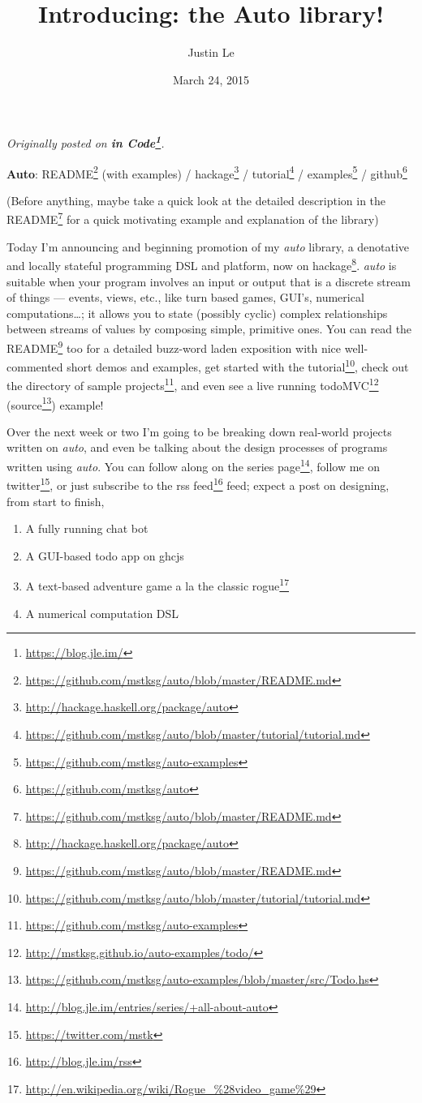 \documentclass[]{article}
\title{Introducing: the Auto library!}
\author{Justin Le}
\date{March 24, 2015}
\renewcommand{\href}[2]{#2\footnote{\url{#1}}}
\begin{document}
\maketitle

\emph{Originally posted on \textbf{\href{https://blog.jle.im/}{in
Code}}.}

\textbf{Auto}:
\href{https://github.com/mstksg/auto/blob/master/README.md}{README}
(with examples) /
\href{http://hackage.haskell.org/package/auto}{hackage} /
\href{https://github.com/mstksg/auto/blob/master/tutorial/tutorial.md}{tutorial}
/ \href{https://github.com/mstksg/auto-examples}{examples} /
\href{https://github.com/mstksg/auto}{github}

(Before anything, maybe take a quick look at the detailed description in
the \href{https://github.com/mstksg/auto/blob/master/README.md}{README}
for a quick motivating example and explanation of the library)

Today I'm announcing and beginning promotion of my \emph{auto} library,
a denotative and locally stateful programming DSL and platform, now
\href{http://hackage.haskell.org/package/auto}{on hackage}. \emph{auto}
is suitable when your program involves an input or output that is a
discrete stream of things --- events, views, etc., like turn based
games, GUI's, numerical computations\ldots{}; it allows you to state
(possibly cyclic) complex relationships between streams of values by
composing simple, primitive ones. You can read the
\href{https://github.com/mstksg/auto/blob/master/README.md}{README} too
for a detailed buzz-word laden exposition with nice well-commented short
demos and examples, get started with
\href{https://github.com/mstksg/auto/blob/master/tutorial/tutorial.md}{the
tutorial}, check out the directory of
\href{https://github.com/mstksg/auto-examples}{sample projects}, and
even see a live running
\href{http://mstksg.github.io/auto-examples/todo/}{todoMVC}
(\href{https://github.com/mstksg/auto-examples/blob/master/src/Todo.hs}{source})
example!

Over the next week or two I'm going to be breaking down real-world
projects written on \emph{auto}, and even be talking about the design
processes of programs written using \emph{auto}. You can follow along on
\href{http://blog.jle.im/entries/series/+all-about-auto}{the series
page}, follow me on \href{https://twitter.com/mstk}{twitter}, or just
subscribe to the \href{http://blog.jle.im/rss}{rss feed} feed; expect a
post on designing, from start to finish,

\begin{enumerate}
\def\labelenumi{\arabic{enumi}.}
\tightlist
\item
  A fully running chat bot
\item
  A GUI-based todo app on ghcjs
\item
  A text-based adventure game a la the classic
  \href{http://en.wikipedia.org/wiki/Rogue_\%28video_game\%29}{rogue}
\item
  A numerical computation DSL
\end{enumerate}
\end{document}
